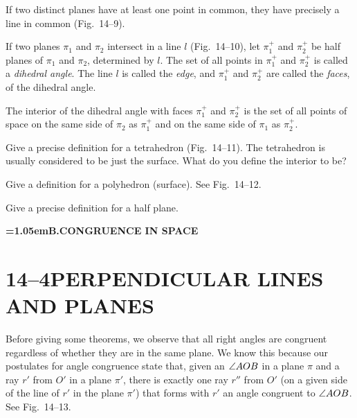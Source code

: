 \documentclass[11pt]{book}
\newcommand{\XIVpart}[1]{%
  \par\addvspace{1.5\baselineskip}\nopagebreak
  \begin{center}\bfseries\spaceskip=1.05em\relax #1\end{center}%
  \nopagebreak\addvspace{0.8\baselineskip}}
\begin{document}
\begin{theorem}
If two distinct planes have at least one point in common, they have precisely a
line in common (Fig.~14--9).
\end{theorem}

\FIGXIVEIGHTNINE

\begin{definition}
If two planes $\pi_1$ and $\pi_2$ intersect in a line $l$ (Fig.~14--10), let
$\pi_1^+$ and $\pi_2^+$ be half planes of $\pi_1$ and $\pi_2$, determined by
$l$. The set of all points in $\pi_1^+$ and $\pi_2^+$ is called a
\emph{dihedral angle}. The line $l$ is called the \emph{edge}, and $\pi_1^+$ and
$\pi_2^+$ are called the \emph{faces}, of the dihedral angle.
\end{definition}

\FIGXIVTEN

\begin{definition}
The interior of the dihedral angle with faces $\pi_1^+$ and $\pi_2^+$ is the set
of all points of space on the same side of $\pi_2$ as $\pi_1^+$ and on the same
side of $\pi_1$ as $\pi_2^+$.
\end{definition}

\begin{exercisecols}
\begin{exlist}
\item Give a precise definition for a tetrahedron (Fig.~14--11). The
      tetrahedron is usually considered to be just the surface. What do you
      define the interior to be?
\exfig{\FIGXIVELEVEN}
\item Give a definition for a polyhedron (surface). See Fig.~14--12.
\exfig{\FIGXIVTWELVE}
\item Give a precise definition for a half plane.
\end{exlist}
\end{exercisecols}

\XIVpart{B.\quad CONGRUENCE IN SPACE}

\section*{14--4\quad PERPENDICULAR LINES\\AND PLANES}

Before giving some theorems, we observe that all right angles are congruent
regardless of whether they are in the same plane. We know this because our
postulates for angle congruence state that, given an $\angle AOB$ in a plane
$\pi$ and a ray $r'$ from $O'$ in a plane $\pi'$, there is exactly one ray $r''$
from $O'$ (on a given side of the line of $r'$ in the plane $\pi'$) that forms
with $r'$ an angle congruent to $\angle AOB$. See Fig.~14--13.
\end{document}
